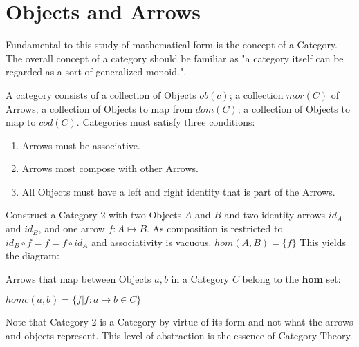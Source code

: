 \documentclass{article}
\begin{document}
\section{Objects and Arrows}
Fundamental to this study of mathematical form is the concept of a Category. The overall concept of a category should be familiar as "a category itself can be regarded as a sort of generalized monoid."\cite{Saunders01}.
\begin{definition}
A category consists of a collection of Objects $ob(c)$; a collection $mor(C)$ of Arrows; a collection of Objects to map from $dom(C)$; a collection of Objects to map to $cod(C)$. Categories must satisfy three conditions: \begin{enumerate}
    \item Arrows must be associative.
    \item Arrows most compose with other Arrows.
    \item All Objects must have a left and right identity that is part of the Arrows.
  \end{enumerate}
\end{definition}
\begin{example}
Construct a Category 2 with two Objects $A$ and $B$ and two identity arrows $id_A$ and $id_B$, and one arrow $f: A \mapsto B$. As composition is restricted to $id_B \circ f = f = f \circ id_A$ and associativity is vacuous. $hom(A,B) = \{f\}$ This yields the diagram:
\begin{center}
\end{center}
\end{example}
\begin{definition}
Arrows that map between Objects $a,b$ in a Category $C$ belong to the \textbf{hom} set:
  \begin{center}
    $homc(a, b) = \{f | f: a \to b \in C\}$
  \end{center}
\end{definition}
\begin{remark}
Note that Category 2 is a Category by virtue of its form and not what the arrows and objects represent. This level of abstraction is the essence of Category Theory.
\end{remark}
\end{document}
